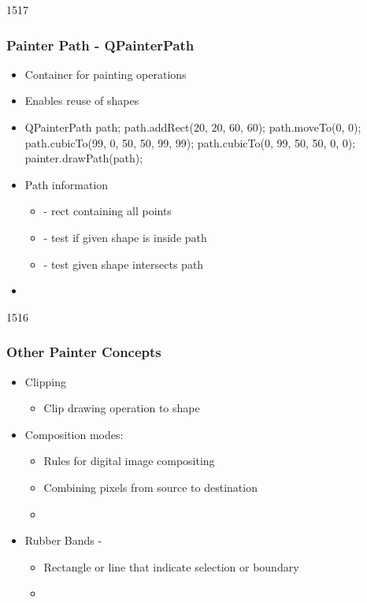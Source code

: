 \begin{slide}[fragile]{1517}\frametitle{Painter Path - QPainterPath}
  \begin{itemize}
  \item Container for painting operations
  \item Enables reuse of shapes
  \item[] \begin{cpp}
QPainterPath path;
path.addRect(20, 20, 60, 60);
path.moveTo(0, 0);
path.cubicTo(99, 0,  50, 50,  99, 99);
path.cubicTo(0, 99,  50, 50,  0, 0);      
painter.drawPath(path);
    \end{cpp}
  \item Path information
    \begin{itemize}
    \item {} - rect containing all points
    \item {} - test if given shape is inside path
    \item {} - test given shape intersects path
    \end{itemize}

  \item[] 

  \end{itemize}

\end{slide}

\begin{slide}{1516}\frametitle{Other Painter Concepts}
  \begin{itemize}
  \item Clipping
    \begin{itemize}
    \item Clip drawing operation to shape
    \end{itemize}
  \item Composition modes:
    \begin{itemize}
    \item Rules for digital image compositing
    \item Combining pixels from source to destination
    \item[] 
    \end{itemize}
  \item Rubber Bands - 
    \begin{itemize}
    \item Rectangle or line that indicate selection or boundary
    \item {}
    \end{itemize}
  \end{itemize}  
\end{slide}

